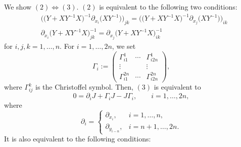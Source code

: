 \documentclass[pdftex]{sigma}
\numberwithin{equation}{section}
\begin{document}
We show $(2)\Leftrightarrow (3)$. $(2)$ is equivalent to the following two conditions:
\begin{align}
& \bigl(\bigl(Y+XY^{-1}X\bigr)^{-1}\partial_{x_i}\bigl(XY^{-1}\bigr)\bigr)_{jk}=\bigl(\bigl(Y+XY^{-1}X\bigr)^{-1}\partial_{x_j}\bigl(XY^{-1}\bigr)\bigr)_{ik} \label{ReOmega}\\
& \partial_{x_i}\bigl(Y+XY^{-1}X\bigr)^{-1}_{jk}=\partial_{x_j}\bigl(Y+XY^{-1}X\bigr)^{-1}_{ik}\label{ImOmega}
\end{align}
for $i, j, k=1,\ldots , n$. For $i=1, \ldots ,2n$, we set
\[
\Gamma_i:=
\begin{pmatrix}
\Gamma^1_{i 1} & \cdots & \Gamma^1_{i 2n} \\
\vdots & & \vdots \\
\Gamma^{2n}_{i 1} & \cdots & \Gamma^{2n}_{i 2n}
\end{pmatrix},
\]
where $\Gamma_{ij}^k$ is the Christoffel symbol. Then, $(3)$ is equivalent to
\[
0=\partial_iJ+\Gamma_iJ-J\Gamma_i, \qquad i=1,\ldots ,2n,
\]
where
\[
\partial_i=
\begin{cases}
\partial_{x_i}, & i=1,\ldots ,n, \\
\partial_{y_{i-n}}, & i=n+1,\ldots , 2n.
\end{cases}
\]
It is also equivalent to the following conditions:
\end{document}
